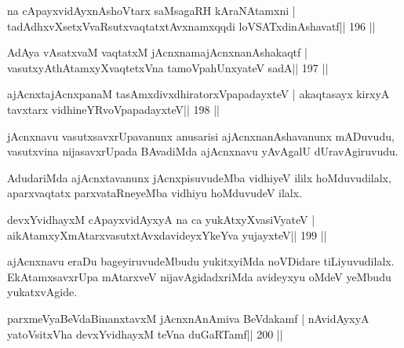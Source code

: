 \begin{shl}
na cApayxvidAyxnAshoV\s tarx saMsagaRH kAraNAtamxni |
tadAdhxvXsetxVvaRsutxvaqtatxtAvxnamxqqdi loVSATxdinAshavatf\hfill || 196 ||
\end{shl}

\begin{shl}
AdAya vAsatxvaM vaqtatxM jAcnxnamajAcnxnanAshakaqtf |
vasutxyAthAtamxyXvaqtetxVna tamoV\s pahUnxyateV sadA\hfill || 197 ||
\end{shl}

\begin{shl}
ajAcnxtajAcnxpanaM tasAmxdivxdhiratorxVpapadayxteV |
akaqtasayx kirxyA tavxtarx vidhineYRvoVpapadayxteV\hfill || 198 ||
\end{shl}

\begin{artha}
jAcnxnavu vasutxsavxrUpavanunx anusarisi ajAcnxnanAshavanunx mADuvudu, vasutxvina nijasavxrUpada BAvadiMda ajAcnxnavu yAvAgalU dUravAgiruvudu.
\end{artha}

\begin{artha}
AdudariMda ajAcnxtavanunx jAcnxpisuvudeMba vidhiyeV ililx hoMduvudilalx, aparxvaqtatx parxvataRneyeMba vidhiyu hoMduvudeV ilalx.
\end{artha}


\begin{shl}
\footnotemark[1]devxYvidhayxM cApayxvidAyxyA na ca yukAtxyX\s vasiVyateV |
\footnotemark[2]aikAtamxyXmAtarxvasutxtAvxdavideyxYkeYva yujayxteV\hfill || 199 ||
\end{shl}

\begin{artha}
ajAcnxnavu eraDu bageyiruvudeMbudu yukitxyiMda noVDidare tiLiyuvudilalx. EkAtamxsavxrUpa mAtarxveV nijavAgidadxriMda avideyxyu oMdeV yeMbudu yukatxvAgide.
\end{artha}

\begin{shl}
parxmeVyaBeVdaBinanxtavxM jAcnxnAnAmiva BeVdakamf |
nAvidAyxyA yatoV\s sitxVha devxYvidhayxM teVna duGaRTamf\hfill || 200 ||
\end{shl}

